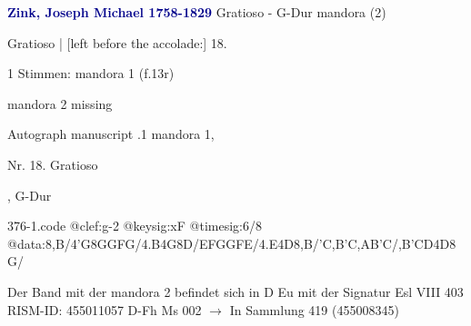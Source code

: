 \documentclass[twocolumn]{book}
\begin{document}
\newline \par \vspace{7pt} \textcolor{darkblue}{\textbf{Zink, Joseph Michael  1758-1829}}
\newline Gratioso - G-Dur
\newline mandora (2)
\newline \begin{itshape}[f.13r, at left:] Gratioso | [left before the accolade:] 18.\end{itshape} 
\newline \textcolor{darkblue}{}  1 Stimmen: mandora 1  (f.13r)
\newline \begin{small} mandora 2 missing\end{small} 
\newline Autograph manuscript
.1  mandora 1, \begin{itshape}Nr. 18. Gratioso\end{itshape}, G-Dur  
\begin{filecontents*}{376-1.code}
@clef:g-2
@keysig:xF
@timesig:6/8
@data:8,B/4'G8GGFG/4.B4G8D/{EF}GGFE/4.E4D8,B/'C,B'C,AB'C/{,B'C}D4D8G/
\end{filecontents*}
\newline
%
\newline Der Band mit der mandora 2 befindet sich in D Eu mit der Signatur Esl VIII 403
\newline RISM-ID: 455011057
\newline D-Fh  Ms 002
\newline $\rightarrow$ In Sammlung 419 (455008345)
      
\end{document}
